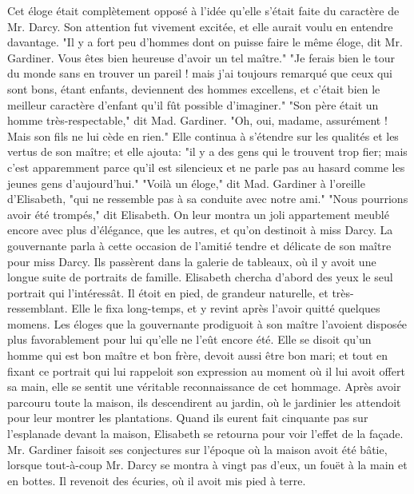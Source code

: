 Cet éloge était complètement opposé à l'idée qu'elle s'était faite du caractère de Mr. Darcy. Son attention fut vivement excitée, et elle aurait voulu en entendre davantage.
"Il y a fort peu d'hommes dont on puisse faire le même éloge, dit Mr. Gardiner. Vous êtes bien heureuse d'avoir un tel maître."
"Je ferais bien le tour du monde sans en trouver un pareil ! mais j'ai toujours remarqué que ceux qui sont bons, étant enfants, deviennent des hommes excellens, et c'était bien le meilleur caractère d'enfant qu'il fût possible d'imaginer."
"Son père était un homme très-respectable," dit Mad. Gardiner.
"Oh, oui, madame, assurément ! Mais son fils ne lui cède en rien." Elle continua à s'étendre sur les qualités et les vertus de son\setcounter{page}{105} maître; et elle ajouta: "il y a des gens qui le trouvent trop fier; mais c'est apparemment parce qu'il est silencieux et ne parle pas au hasard comme les jeunes gens d'aujourd'hui."
"Voilà un éloge," dit Mad. Gardiner à l'oreille d'Elisabeth, "qui ne ressemble pas à sa conduite avec notre ami."
"Nous pourrions avoir été trompés," dit Elisabeth.
On leur montra un joli appartement meublé encore avec plus d'élégance, que les autres, et qu'on destinoit à miss Darcy. La gouvernante parla à cette occasion de l'amitié tendre et délicate de son maître pour miss Darcy.
Ils passèrent dans la galerie de tableaux, où il y avoit une longue suite de portraits de famille. Elisabeth chercha d'abord des yeux le seul portrait qui l'intéressât. Il étoit en pied, de grandeur naturelle, et très-ressemblant. Elle le fixa long-temps, et y revint après l'avoir quitté quelques momens. Les éloges que la gouvernante prodiguoit à son maître l'avoient disposée plus favorablement pour lui qu'elle ne l'eût encore été. Elle se disoit qu'un homme qui est bon maître et bon frère, devoit aussi être bon mari; et tout en fixant ce portrait qui lui\setcounter{page}{106} rappeloit son expression au moment où il lui avoit offert sa main, elle se sentit une véritable reconnaissance de cet hommage.
Après avoir parcouru toute la maison, ils descendirent au jardin, où le jardinier les attendoit pour leur montrer les plantations. Quand ils eurent fait cinquante pas sur l’esplanade devant la maison, Elisabeth se retourna pour voir l’effet de la façade. Mr. Gardiner faisoit ses conjectures sur l’époque où la maison avoit été bâtie, lorsque tout-à-coup Mr. Darcy se montra à vingt pas d’eux, un fouët à la main et en bottes. Il revenoit des écuries, où il avoit mis pied à terre.
